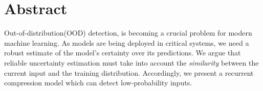 
\chapter{Abstract}

Out-of-distribution(OOD) detection, is becoming a crucial problem for modern machine learning. As models are being deployed in critical systems, we need a robust estimate of the model's certainty over its predictions. We argue that reliable uncertainty estimation must take into account the \emph{similarity} between the current input and the training distribution. Accordingly, we present a recurrent compression model which can detect low-probability inputs. 

